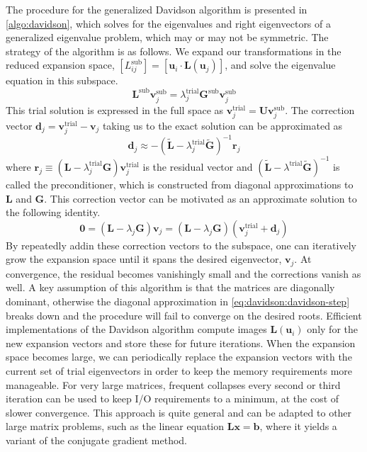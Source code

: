 The procedure for the generalized Davidson algorithm is presented in
\cref{algo:davidson}, which solves for the eigenvalues and right eigenvectors of
a generalized eigenvalue problem, which may or may not be symmetric.
The strategy of the algorithm is as follows.
We expand our transformations in the reduced expansion space,
\(
    [L_{ij}^\mathrm{sub}]
    =
    [\mathbf{u}_i\cdot \mathbf{L}(\mathbf{u}_j)]
\),
and solve the eigenvalue equation in this subspace.
\begin{equation}
    \mathbf{L}^\mathrm{sub}
    \mathbf{v}_j^\mathrm{sub}
    =
    \lambda_j^\mathrm{trial}
    \mathbf{G}^\mathrm{sub}
    \mathbf{v}_j^\mathrm{sub}
\end{equation}
This trial solution is expressed in the full space as
\(
    \mathbf{v}_j^\mathrm{trial}
    =
    \mathbf{U}\mathbf{v}_j^\mathrm{sub}
\).
The correction vector
\(
    \mathbf{d}_j
    =
    \mathbf{v}_j^\mathrm{trial}
    -
    \mathbf{v}_j
\)
taking us to the exact solution can be approximated as
\begin{equation}
    \label{eq:davidson:davidson-step}
    \mathbf{d}_j
    \approx
    -
    (
        \tilde{\mathbf{L}}
        -
        \lambda_j^\mathrm{trial}
        \tilde{\mathbf{G}}
    )^{-1}
    \mathbf{r}_j
\end{equation}
where
\(
    \mathbf{r}_j
    \equiv
    (\mathbf{L} - \lambda_j^\mathrm{trial}\mathbf{G})
    \mathbf{v}_j^\mathrm{trial}
\)
is the residual vector and
\(
    (
        \tilde{\mathbf{L}} - \lambda^\mathrm{trial}\tilde{\mathbf{G}}
    )^{-1}
\)
is called the preconditioner, which is constructed from diagonal
approximations to \(\mathbf{L}\) and \(\mathbf{G}\).
This correction vector can be motivated as an approximate solution to the
following identity.
\begin{equation}
    \mathbf{0}
    =
    (\mathbf{L} - \lambda_j\mathbf{G})
    \mathbf{v}_j
    =
    (\mathbf{L} - \lambda_j\mathbf{G})
    (
        \mathbf{v}_j^\mathrm{trial}
        +
        \mathbf{d}_j
    )
\end{equation}
By repeatedly addin these correction vectors to the subspace, one can
iteratively grow the expansion space until it spans the desired eigenvector,
\(\mathbf{v}_j\).
At convergence, the residual becomes vanishingly small and the corrections
vanish as well.
A key assumption of this algorithm is that the matrices are diagonally
dominant, otherwise the diagonal approximation in
\cref{eq:davidson:davidson-step} breaks down and the procedure will
fail to converge on the desired roots.
Efficient implementations of the Davidson algorithm compute images
\(\mathbf{L}(\mathbf{u}_i)\) only for the new expansion vectors and
store these for future iterations.
When the expansion space becomes large, we can periodically replace the
expansion vectors with the current set of trial eigenvectors in order to
keep the memory requirements more manageable.
For very large matrices, frequent collapses every second or third iteration can be used to keep I/O requirements to a minimum, at the cost
of slower convergence.\cite{Leininger:2001p1574}
This approach is quite general and can be adapted to other large matrix
problems, such as the linear equation
\(\mathbf{L}\mathbf{x}=\mathbf{b}\), where it yields a variant of the
conjugate gradient method.


